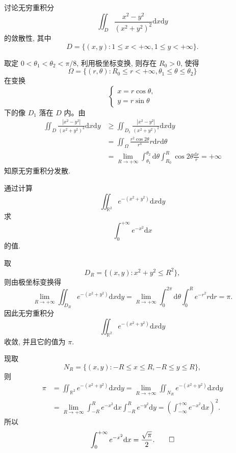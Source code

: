 \begin{example}\label{example:ma-15-5-4}
讨论无穷重积分
\[
  \iint_D\frac{x^2-y^2}{(x^2+y^2)^2}\mathrm dx\mathrm dy
\]
的敛散性, 其中
\[
  D=\{(x,y):1\leqslant x<+\infty,1\leqslant y<+\infty\}.
\]
\end{example}


\begin{solve}
取定 $0<\theta_1<\theta_2<\pi/8$, 利用极坐标变换, 则存在 $R_0>0$, 使得
\[
  \Omega=\{(r,\theta):R_0\leqslant r<+\infty,\theta_1\leqslant\theta\leqslant\theta_2\}
\]
在变换
\[
  \begin{cases}
    x=r\cos\theta,\\
    y=r\sin\theta
  \end{cases}
\]
下的像 $D_1$ 落在 $D$ 内。由
\[
\begin{aligned}
  \iint_D\frac{|x^2-y^2|}{(x^2+y^2)^2}\mathrm dx\mathrm dy
  &\geqslant\iint_{D_1}\frac{|x^2-y^2|}{(x^2+y^2)^2}\mathrm dx\mathrm dy\\
  &=\iint_\Omega\frac{r^2\cos2\theta}{r^4}r\mathrm dr\mathrm d\theta\\
  &=\lim_{R\to+\infty}\int_{\theta_1}^{\theta_2}\mathrm d\theta
  \int_{R_0}^R\cos2\theta\frac{\mathrm dr}r=+\infty
\end{aligned}
\]
知原无穷重积分发散.
\end{solve}


\begin{example}\label{example:ma-15-5-5}
通过计算
\[
  \iint_{\mathbb R^2}e^{-(x^2+y^2)}\mathrm dx\mathrm dy
\]
求
\[
  \int_0^{+\infty}e^{-x^2}\mathrm dx
\]
的值.
\end{example}


\begin{solve}
取
\[
  D_R=\{(x,y):x^2+y^2\leqslant R^2\},
\]
则由极坐标变换得
\[
  \lim_{R\to+\infty}\iint_{D_R}e^{-(x^2+y^2)}\mathrm dx\mathrm dy
  =\lim_{R\to+\infty}\int_0^{2\pi}\mathrm d\theta\int_0^R e^{-r^2}r\mathrm dr=\pi.
\]
因此无穷重积分
\[
  \iint_{\mathbb R^2}e^{-(x^2+y^2)}\mathrm dx\mathrm dy
\]
收敛, 并且它的值为 $\pi$.

现取
\[
  N_R=\{(x,y):-R\leqslant x\leqslant R,-R\leqslant y\leqslant R\},
\]
则
\[
\begin{aligned}
  \pi&=\iint_{\mathbb R^2}e^{-(x^2+y^2)}\mathrm dx\mathrm dy
  =\lim_{R\to+\infty}\iint_{N_R}e^{-(x^2+y^2)}\mathrm dx\mathrm dy\\
  &=\lim_{R\to+\infty}\int_{-R}^R e^{-x^2}\mathrm dx
  \int_{-R}^R e^{-y^2}\mathrm dy
  =\left(\int_{-\infty}^{+\infty}e^{-x^2}\mathrm dx\right)^2.
\end{aligned}
\]
所以
\[
  \int_0^{+\infty}e^{-x^2}\mathrm dx=\frac{\sqrt\pi}2.
\qedhere
\]
\end{solve}


